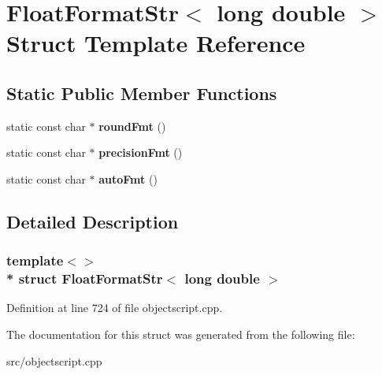 \hypertarget{struct_float_format_str_3_01long_01double_01_4}{}\section{Float\+Format\+Str$<$ long double $>$ Struct Template Reference}
\label{struct_float_format_str_3_01long_01double_01_4}
\subsection*{Static Public Member Functions}
\begin{DoxyCompactItemize}
\item 
static const char $\ast$ {\bfseries round\+Fmt} ()\hypertarget{struct_float_format_str_3_01long_01double_01_4_a66f9bdda3ce87504e769dceaa11f7987}{}\label{struct_float_format_str_3_01long_01double_01_4_a66f9bdda3ce87504e769dceaa11f7987}

\item 
static const char $\ast$ {\bfseries precision\+Fmt} ()\hypertarget{struct_float_format_str_3_01long_01double_01_4_a14f49aa6151bb972fbb332d0e2d7cf76}{}\label{struct_float_format_str_3_01long_01double_01_4_a14f49aa6151bb972fbb332d0e2d7cf76}

\item 
static const char $\ast$ {\bfseries auto\+Fmt} ()\hypertarget{struct_float_format_str_3_01long_01double_01_4_a2a11bd8f6babeb31fbac80d030b58e55}{}\label{struct_float_format_str_3_01long_01double_01_4_a2a11bd8f6babeb31fbac80d030b58e55}

\end{DoxyCompactItemize}


\subsection{Detailed Description}
\subsubsection*{template$<$$>$\\*
struct Float\+Format\+Str$<$ long double $>$}



Definition at line 724 of file objectscript.\+cpp.



The documentation for this struct was generated from the following file\+:\begin{DoxyCompactItemize}
\item 
src/objectscript.\+cpp\end{DoxyCompactItemize}
